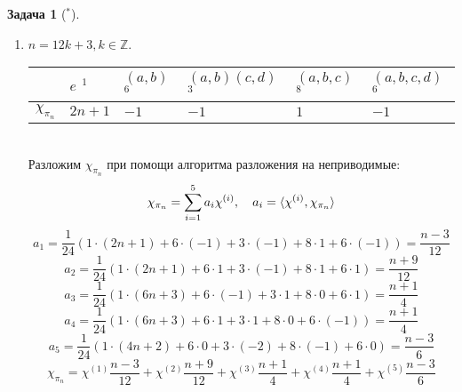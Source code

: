 \documentclass[12pt]{article}
\theoremstyle{definition}
\newtheorem{zad}{Задача}[section]
\begin{document}
\begin{zad}[$^*$]
\begin{itemize}
\begin{enumerate}
    \item $n=12k+3,k\in\mathbb{Z}$.
    \begin{table}[h!]
    \centering
    \begin{tabular}{|l|l|l|l|l|l|}
    \hline
     & $e$ $^1$ & $(a,b)$ $^6$ & $(a,b)(c,d)$ $^3$ & $(a,b,c)$ $^8$ & $(a,b,c,d)$ $^6$ \\ \hline
    $\chi_{\pi_n}$ & $2n+1$ & $-1$ & $-1$ & $1$ & $-1$ \\ \hline
    \end{tabular}
    \end{table}\\
    Разложим $\chi_{\pi_n}$ при помощи алгоритма разложения на неприводимые:
    \begin{equation}
        \chi_{\pi_n}=\sum\limits_{i=1}^5 a_i\chi^{(i)},\quad a_i=\braket{\chi^{(i)},\chi_{\pi_n}}
    \end{equation}
    \begin{equation}
        a_1=\frac{1}{24}(1\cdot(2n+1)+6\cdot(-1)+3\cdot(-1)+8\cdot1+6\cdot(-1))=\frac{n-3}{12}
    \end{equation}
    \begin{equation}
        a_2=\frac{1}{24}(1\cdot(2n+1)+6\cdot1+3\cdot(-1)+8\cdot1+6\cdot1)=\frac{n+9}{12}
    \end{equation}
    \begin{equation}
        a_3=\frac{1}{24}(1\cdot(6n+3)+6\cdot(-1)+3\cdot1+8\cdot0+6\cdot1)=\frac{n+1}{4}
    \end{equation}
    \begin{equation}
        a_4=\frac{1}{24}(1\cdot(6n+3)+6\cdot1+3\cdot1+8\cdot0+6\cdot(-1))=\frac{n+1}{4}
    \end{equation}
    \begin{equation}
        a_5=\frac{1}{24}(1\cdot(4n+2)+6\cdot0+3\cdot(-2)+8\cdot(-1)+6\cdot0)=\frac{n-3}{6}
    \end{equation}
    \begin{equation}
        \boxed{\chi_{\pi_n}=\chi^{(1)}\frac{n-3}{12}+\chi^{(2)}\frac{n+9}{12}+\chi^{(3)}\frac{n+1}{4}+\chi^{(4)}\frac{n+1}{4}+\chi^{(5)}\frac{n-3}{6}}
    \end{equation}
    

\end{enumerate}
\end{itemize}
\end{zad}
\end{document}
